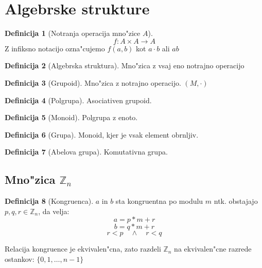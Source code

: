 \documentclass{article}
\theoremstyle{definition}
\newtheorem{definition}{Definicija}[section]
\theoremstyle{remark}
\newcommand{\Z}{\mathbb{Z}}
\begin{document}
	\section{Algebrske strukture}
	\begin{definition}[Notranja operacija mno"zice $A$]
		\[ f: A \times A \rightarrow A\]
		Z infiksno notacijo ozna"cujemo $f(a,b)$ kot $a \cdot b$ ali $ab$
	\end{definition}
	\begin{definition}[Algebrska struktura]
		Mno"zica z vsaj eno notrajno operacijo
	\end{definition}
	\begin{definition}[Grupoid]
		Mno"zica z notrajno operacijo. $(M, \cdot)$
	\end{definition}
	\begin{definition}[Polgrupa]
		Asociativen grupoid.
	\end{definition}
	\begin{definition}[Monoid]
		Polgrupa z enoto.
	\end{definition}
	\begin{definition}[Grupa]
		Monoid, kjer je vsak element obrnljiv.
	\end{definition}
	\begin{definition}[Abelova grupa]
		Komutativna grupa.
	\end{definition}

	\begin{comment}
	\begin{definition}[Kolobar]
		Mno"zica z 2 operacijama $(M, +, \cdot)$ \\
		kjer je $(M, +)$ abelova grupa in $(M, \cdot)$ monoid.
	\end{definition}
	\begin{definition}[Obseg]
		Kolobar, kjer so neni"celni elementi grupa za $\cdot$
	\end{definition}
	\begin{definition}[Polje]
		Komutativni obseg
	\end{definition}
	\begin{definition}[Modul]
		Kolobar z abelovo grupo $((M, +, \cdot), (V, \oplus))$
	\end{definition}
	\begin{definition}[Vektorski prostor]
		Modul, kjer je $(M, +, \cdot)$ polje.
	\end{definition}
	\end{comment}
	
	\subsection{Mno"zica $\Z_n$}
	\begin{definition}[Kongruenca]
			$a$ in $b$ sta kongruentna po modulu $m$ ntk. obstajajo $p,q,r \in \Z_n$, da velja:
			\[ a = p*m + r \]
			\[ b = q*m + r \]
			\[ r < p \quad \land \quad r < q \]
	\end{definition}
	Relacija kongruence je ekvivalen"cna, zato razdeli $\Z_n$ na ekvivalen"cne razrede ostankov: $\lbrace 0, 1, \ldots, n-1 \rbrace$
	
\end{document}
